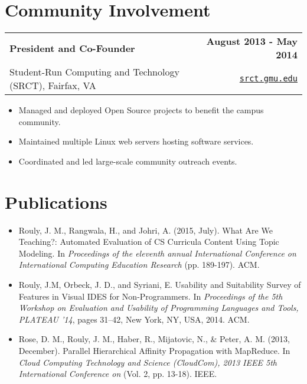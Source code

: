 \documentclass[letterpaper]{article}
\newenvironment{details}
{\begin{itemize}}
{\end{itemize}}
\begin{document}
  \section{Community Involvement}
  \noindent
  \begin{tabularx}{\textwidth}{@{}X r@{}}
    \textbf{President and Co-Founder} & \textbf{August 2013 - May 2014} \\
    Student-Run Computing and Technology (SRCT), Fairfax, VA & \texttt{\href{srct.gmu.edu}{srct.gmu.edu}}
  \end{tabularx}

  \begin{details}
  \item Managed and deployed Open Source projects to benefit the campus community.
  \item Maintained multiple Linux web servers hosting software services.
  \item Coordinated and led large-scale community outreach events.
  \end{details}


  \section{Publications}
  \noindent
  \begin{details}
  \item Rouly, J. M., Rangwala, H., and Johri, A. (2015, July). What Are We
  Teaching?: Automated Evaluation of CS Curricula Content Using Topic
  Modeling. In \emph{Proceedings of the eleventh annual International
  Conference on International Computing Education Research} (pp. 189-197). ACM.

  \item Rouly, J.M, Orbeck, J. D., and Syriani, E.
  Usability and Suitability Survey of Features in Visual IDES for
  Non-Programmers. In \emph{Proceedings of the 5th Workshop on Evaluation
  and Usability of Programming Languages and Tools, PLATEAU '14}, pages
  31–42, New York, NY, USA, 2014. ACM.

  \item Rose, D. M., Rouly, J. M., Haber, R., Mijatovic, N., \& Peter, A.
  M. (2013, December). Parallel Hierarchical Affinity Propagation with
  MapReduce. In \emph{Cloud Computing Technology and Science (CloudCom),
  2013 IEEE 5th International Conference on} (Vol. 2, pp. 13-18). IEEE.
  \end{details}


\end{document}
